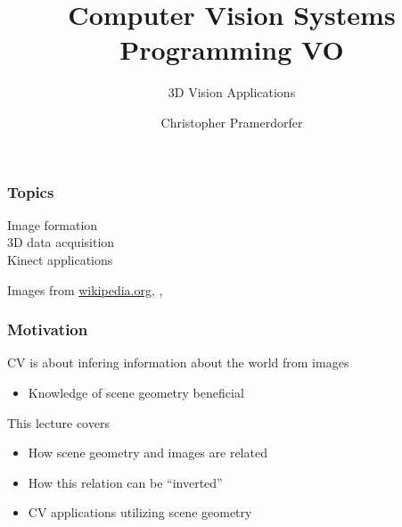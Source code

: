 \documentclass[xetex,professionalfont]{beamer}
\title{Computer Vision Systems Programming VO}
\subtitle{3D Vision Applications}
\author{Christopher Pramerdorfer}
\institute{Computer Vision Lab, Vienna University of Technology}
\begin{document}

\begin{frame}
\maketitle
\end{frame}


\begin{frame}
\frametitle{Topics}


Image formation\\\medskip
3D data acquisition\\\medskip
Kinect applications

\bigskip
\begin{center}
    {\centering Images from \url{wikipedia.org}, \cite{shotton2011}, \cite{newcombe2011}}
\end{center}

\end{frame}


\begin{frame}
\frametitle{Motivation}

CV is about infering information about the world from images
\begin{itemize}
    \item Knowledge of scene geometry beneficial %
\end{itemize}

\bigskip
This lecture covers
\begin{itemize}
    \item How scene geometry and images are related
    \item How this relation can be \enquote{inverted} %
    \item CV applications utilizing scene geometry
\end{itemize}

\end{frame}
\end{document}
